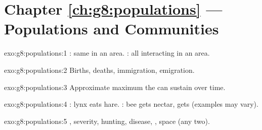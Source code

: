 \section*{Chapter \ref{ch:g8:populations} --- Populations and Communities}

\begin{solution}{exo:g8:populations:1}
: same  in an area. : all interacting
 in an area.
\end{solution}

\begin{solution}{exo:g8:populations:2}
Births, deaths, immigration, emigration.
\end{solution}

\begin{solution}{exo:g8:populations:3}
Approximate maximum  the  can sustain over time.
\end{solution}

\begin{solution}{exo:g8:populations:4}
: lynx eats hare. : bee gets nectar,  gets
 (examples may vary).
\end{solution}

\begin{solution}{exo:g8:populations:5}
,  severity, hunting, disease, , space (any two).
\end{solution}

